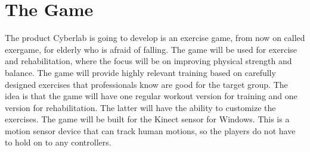 \section{The Game}
The product Cyberlab is going to develop is an exercise game, from now on called exergame, for elderly who is afraid of falling. The game will be used for exercise and rehabilitation, where the focus will be on improving physical strength and balance. The game will provide highly relevant training based on carefully designed exercises that professionals know are good for the target group. The idea is that the game will have one regular workout version for training and one version for rehabilitation. The latter will have the ability to customize the exercises. The game will be built for the Kinect sensor for Windows. This is a motion sensor device that can track human motions, so the players do not have to hold on to any controllers.

